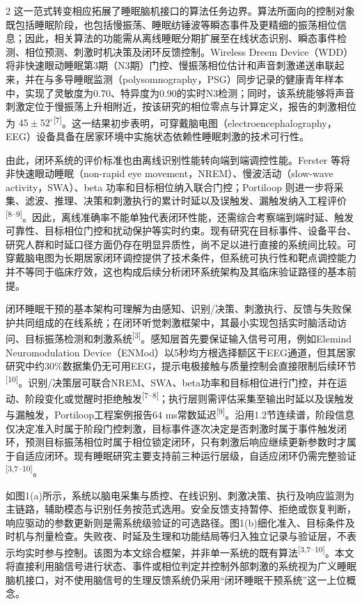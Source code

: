 \documentclass[UTF8,zihao=5,fontset=none]{ctexart}
\newcommand{\hei}{\CJKfamily{hei}}
\newcommand{\leveltwo}[1]{%
  \par\noindent{\hei\fontsize{10.5pt}{12.6pt}\selectfont\mdseries #1\par}}
\newcommand{\refcite}[1]{\nolinebreak[4]\textsuperscript{[#1]}}
\begin{document}
\begin{multicols}{2}
这一范式转变相应拓展了睡眠脑机接口的算法任务边界。算法所面向的控制对象既包括睡眠阶段，也包括慢振荡、睡眠纺锤波等瞬态事件及更精细的振荡相位信息；因此，相关算法的功能需从离线睡眠分期扩展至在线状态识别、瞬态事件检测、相位预测、刺激时机决策及闭环反馈控制。Wireless Dreem Device（WDD）将非快速眼动睡眠第3期（N3期）门控、慢振荡相位估计和声音刺激递送串联起来，并在与多导睡眠监测（polysomnography，PSG）同步记录的健康青年样本中，实现了灵敏度为0.70、特异度为0.90的实时N3检测；同时，该系统能够将声音刺激定位于慢振荡上升相附近，按该研究的相位零点与计算定义，报告的刺激相位为 $45\pm52^{\circ}$\refcite{7}。这一结果初步表明，可穿戴脑电图（electroencephalography，EEG）设备具备在居家环境中实施状态依赖性睡眠刺激的技术可行性。

由此，闭环系统的评价标准也由离线识别性能转向端到端调控性能。Ferster 等将非快速眼动睡眠（non-rapid eye movement，NREM）、慢波活动（slow-wave activity，SWA）、beta 功率和目标相位纳入联合门控；Portiloop 则进一步将采集、滤波、推理、决策和刺激执行的累计时延以及误触发、漏触发纳入工程评价\refcite{8--9}。因此，离线准确率不能单独代表闭环性能，还需综合考察端到端时延、触发可靠性、目标相位门控和扰动保护等实时约束。现有研究在目标事件、设备平台、研究人群和时延口径方面仍存在明显异质性，尚不足以进行直接的系统间比较。可穿戴脑电图为长期居家闭环调控提供了技术条件，但系统可执行性和靶点调控能力并不等同于临床疗效，这也构成后续分析闭环系统架构及其临床验证路径的基本前提。

\leveltwo{1.3 闭环睡眠干预系统的基本架构}

闭环睡眠干预的基本架构可理解为由感知、识别/决策、刺激执行、反馈与失败保护共同组成的在线系统；在闭环听觉刺激框架中，其最小实现包括实时脑活动访问、目标振荡检测和刺激系统\refcite{3}。感知层首先要保证输入信号可用，例如Elemind Neuromodulation Device（ENMod）以5秒均方根选择额区干EEG通道，但其居家研究中约30\%数据集仍无可用EEG，提示电极接触与质量控制会直接限制后续环节\refcite{10}。识别/决策层可联合NREM、SWA、beta功率和目标相位进行门控，并在运动、阶段变化或觉醒时拒绝触发\refcite{7--8}；执行层则需评估采集至输出时延以及误触发与漏触发，Portiloop工程案例报告64 ms常数延迟\refcite{9}。沿用1.2节连续谱，阶段信息仅决定准入时属于阶段门控刺激，目标事件逐次决定是否刺激时属于事件触发闭环，预测目标振荡相位时属于相位锁定闭环，只有刺激后响应继续更新参数时才属于自适应闭环。现有睡眠研究主要支持前三种运行层级，自适应闭环仍需完整验证\refcite{3,7--10}。

如图1(a)所示，系统以脑电采集与质控、在线识别、刺激决策、执行及响应监测为主链路，辅助模态与识别任务按范式选用。安全反馈支持暂停、拒绝或恢复判断，响应驱动的参数更新则是需系统级验证的可选路径。图1(b)细化准入、目标条件及时机与剂量检查。失败夜、时延及生理和功能结局等归入独立记录与验证层，不表示均实时参与控制。该图为本文综合框架，并非单一系统的既有算法\refcite{3,7--10}。本文将直接利用脑信号进行状态、事件或相位判定并控制外部刺激的系统视为广义睡眠脑机接口，对不使用脑信号的生理反馈系统仍采用“闭环睡眠干预系统”这一上位概念。\par


\end{multicols}
\end{document}

